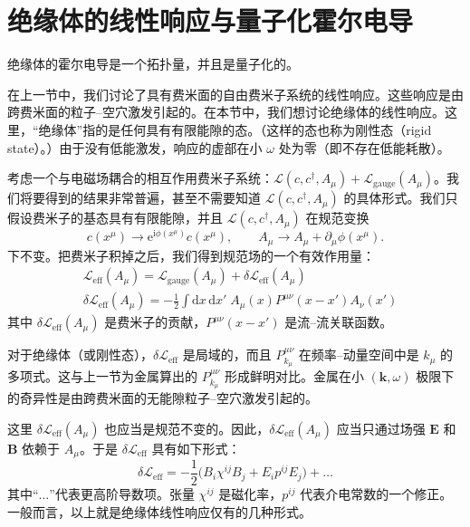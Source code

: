 \section{绝缘体的线性响应与量子化霍尔电导}

\begin{keypoints}
\item 绝缘体的霍尔电导是一个拓扑量，并且是量子化的。
\end{keypoints}

在上一节中，我们讨论了具有费米面的自由费米子系统的线性响应。这些响应是由跨费米面的粒子--空穴激发引起的。在本节中，我们想讨论绝缘体的线性响应。这里，``绝缘体''指的是任何具有有限能隙的态。（这样的态也称为刚性态（rigid state）。）由于没有低能激发，响应的虚部在小 $\omega$ 处为零（即不存在低能耗散）。

考虑一个与电磁场耦合的相互作用费米子系统：$\mathcal{L}(c, c^{\dagger}, A_{\mu}) + \mathcal{L}_{\mathrm{gauge}}(A_{\mu})$。我们将要得到的结果非常普遍，甚至不需要知道 $\mathcal{L}(c, c^{\dagger}, A_{\mu})$ 的具体形式。我们只假设费米子的基态具有有限能隙，并且 $\mathcal{L}(c, c^{\dagger}, A_{\mu})$ 在规范变换
\begin{equation*}
c(x^{\mu}) \to \mathrm{e}^{\mathrm{i}\phi(x^{\mu})} c(x^{\mu}), \qquad A_{\mu} \to A_{\mu} + \partial_{\mu} \phi(x^{\mu}).
\end{equation*}
下不变。把费米子积掉之后，我们得到规范场的一个有效作用量：
\begin{align*}
&\mathcal{L}_{\mathrm{eff}}(A_{\mu}) = \mathcal{L}_{\mathrm{gauge}}(A_{\mu}) + \delta\mathcal{L}_{\mathrm{eff}}(A_{\mu})\\
&\delta\mathcal{L}_{\mathrm{eff}}(A_{\mu}) = -\frac{1}{2} \int \mathrm{d}x\, \mathrm{d}x'\; A_{\mu}(x) P^{\mu\nu}(x - x') A_{\nu}(x')
\end{align*}
其中 $\delta\mathcal{L}_{\mathrm{eff}}(A_{\mu})$ 是费米子的贡献，$P^{\mu\nu}(x-x')$ 是流--流关联函数。

对于绝缘体（或刚性态），$\delta\mathcal{L}_{\mathrm{eff}}$ 是局域的，而且 $P^{\mu\nu}_{k_{\mu}}$ 在频率--动量空间中是 $k_{\mu}$ 的多项式。这与上一节为金属算出的 $P^{\mu\nu}_{k_{\mu}}$ 形成鲜明对比。金属在小 $(\pmb{k}, \omega)$ 极限下的奇异性是由跨费米面的无能隙粒子--空穴激发引起的。

这里 $\delta\mathcal{L}_{\mathrm{eff}}(A_{\mu})$ 也应当是规范不变的。因此，$\delta\mathcal{L}_{\mathrm{eff}}(A_{\mu})$ 应当只通过场强 $\pmb{E}$ 和 $\pmb{B}$ 依赖于 $A_{\mu}$。于是 $\delta\mathcal{L}_{\mathrm{eff}}$ 具有如下形式：
\begin{equation*}
\delta\mathcal{L}_{\mathrm{eff}} = -\frac{1}{2} \big( B_{i} \chi^{ij} B_{j} + E_{i} p^{ij} E_{j} \big) + \dots
\end{equation*}
其中``$\dots$''代表更高阶导数项。张量 $\chi^{ij}$ 是磁化率，$p^{ij}$ 代表介电常数的一个修正。一般而言，以上就是绝缘体线性响应仅有的几种形式。

